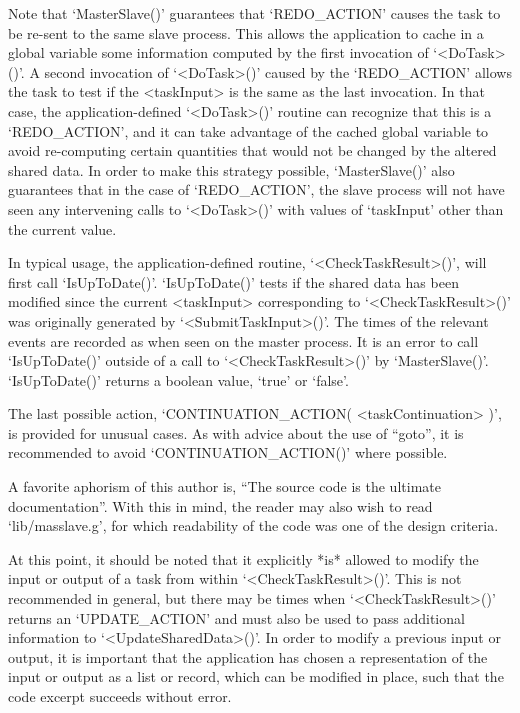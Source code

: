 Note that `MasterSlave()' guarantees that `REDO_ACTION' causes  the  task
to be re-sent to the same slave process. This allows the  application  to
cache in a  global  variable  some  information  computed  by  the  first
invocation of `<DoTask>()'. A second invocation of `<DoTask>()' caused by
the `REDO_ACTION' allows the task to test if the <taskInput> is the  same
as  the  last  invocation.  In   that   case,   the   application-defined
`<DoTask>()' routine can recognize that this is a `REDO_ACTION',  and  it
can take advantage of the cached global variable  to  avoid  re-computing
certain quantities that would not be changed by the altered shared  data.
In order to make this strategy possible, `MasterSlave()' also  guarantees
that in the case of `REDO_ACTION', the slave process will not  have  seen
any intervening calls to `<DoTask>()' with values  of  `taskInput'  other
than the current value.

In typical usage, the application-defined routine, `<CheckTaskResult>()',
will first call `IsUpToDate()'. `IsUpToDate()' tests if the  shared  data
has  been  modified  since  the  current  <taskInput>  corresponding   to
`<CheckTaskResult>()' was originally generated by  `<SubmitTaskInput>()'.
The times of the relevant events are recorded as when seen on the  master
process. It is an error to call  `IsUpToDate()'  outside  of  a  call  to
`<CheckTaskResult>()'  by  `MasterSlave()'.  `IsUpToDate()'   returns   a
boolean value, `true' or `false'.

The last possible action, `CONTINUATION_ACTION( <taskContinuation> )', is
provided for unusual cases. As with advice about the use of ``goto'',  it
is recommended to avoid `CONTINUATION_ACTION()' where possible.

A favorite aphorism of this author is, ``The source code is the  ultimate
documentation''. With this in mind, the reader  may  also  wish  to  read
`lib/masslave.g', for which readability of the code was one of the design
criteria.


At this point, it should be noted that  it  explicitly  *is*  allowed  to
modify the input or output of a task from  within  `<CheckTaskResult>()'.
This is  not  recommended  in  general,  but  there  may  be  times  when
`<CheckTaskResult>()' returns an `UPDATE_ACTION' and must also be used to
pass additional information to `<UpdateSharedData>()'. In order to modify
a previous input or output, it is  important  that  the  application  has
chosen a representation of the input or output as a list or record, which
can be modified in place, such that the  code  excerpt  succeeds  without
error.

